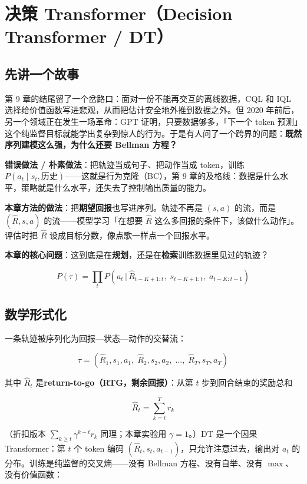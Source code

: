 \documentclass{article}
\begin{document}
\section*{决策 Transformer（Decision Transformer / DT）}

\subsection*{先讲一个故事}

第 9 章的结尾留了一个岔路口：面对一份不能再交互的离线数据，CQL 和 IQL 选择给价值函数写进悲观，从而把估计安全地外推到数据之外。但 2020 年前后，另一个领域正在发生一场革命：GPT 证明，只要数据够多，「下一个 token 预测」这个纯监督目标就能学出复杂到惊人的行为。于是有人问了一个跨界的问题：\textbf{既然序列建模这么强，为什么还要 Bellman 方程？}

\textbf{错误做法 / 朴素做法}：把轨迹当成句子、把动作当成 token，训练 $P(a_t \mid s_t, \text{历史})$——这就是行为克隆（BC），第 9 章的及格线：数据是什么水平，策略就是什么水平，还失去了控制输出质量的能力。

\textbf{本章方法的做法}：把\textbf{期望回报}也写进序列。轨迹不再是 $(s, a)$ 的流，而是 $(\hat R, s, a)$ 的流——模型学习「在想要 $\hat R$ 这么多回报的条件下，该做什么动作」。评估时把 $\hat R$ 设成目标分数，像点歌一样点一个回报水平。

\textbf{本章的核心问题}：这到底是在\textbf{规划}，还是在\textbf{检索}训练数据里见过的轨迹？

\[
\boxed{P(\tau) = \prod_{t} P\!\left(a_t \,\Big|\, \hat{R}_{t-K+1:t},\; s_{t-K+1:t},\; a_{t-K:t-1}\right)}
\]

\subsection*{数学形式化}

一条轨迹被序列化为回报—状态—动作的交替流：

\[
\tau = \left(\hat{R}_1, s_1, a_1,\; \hat{R}_2, s_2, a_2,\; \ldots,\; \hat{R}_T, s_T, a_T\right)
\]

其中 $\hat{R}_t$ 是\textbf{return-to-go（RTG，剩余回报）}：从第 $t$ 步到回合结束的奖励总和

\[
\hat{R}_t = \sum_{k=t}^{T} r_k
\]

（折扣版本 $\sum_{k\ge t}\gamma^{k-t}r_k$ 同理；本章实验用 $\gamma=1$。）DT 是一个因果 Transformer：第 $t$ 个 token 编码 $(\hat{R}_t, s_t, a_{t-1})$，只允许注意过去，输出对 $a_t$ 的分布。训练是纯监督的交叉熵——没有 Bellman 方程、没有自举、没有 $\max$、没有价值函数：
\end{document}
